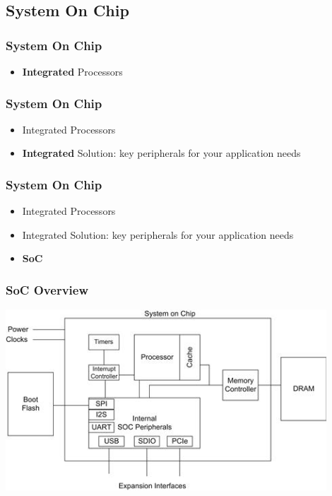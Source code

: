 \subsection{System On Chip}

\begin{frame}
  \frametitle{System On Chip}
  \begin{itemize}
    \item {\bf Integrated} Processors
  \end{itemize}
\end{frame}

\begin{frame}
  \frametitle{System On Chip}
  \begin{itemize}
    \item Integrated Processors
    \item {\bf Integrated} Solution: key peripherals for your application needs
  \end{itemize}
\end{frame}

\begin{frame}
  \frametitle{System On Chip}
  \begin{itemize}
    \item Integrated Processors
    \item Integrated Solution: key peripherals for your application needs
  \item {\bf SoC}
  \end{itemize}
\end{frame}

\begin{frame}
  \frametitle{SoC Overview}
  \begin{center}
    \includegraphics[width=0.9\textwidth]{slides/te5009-embedded-architecture-soc/SoC.jpg}\\
  \end{center}
\end{frame}

